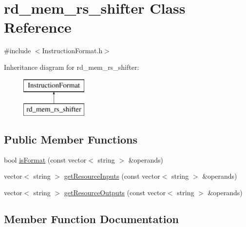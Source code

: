 \hypertarget{classrd__mem__rs__shifter}{}\section{rd\+\_\+mem\+\_\+rs\+\_\+shifter Class Reference}
\label{classrd__mem__rs__shifter}


{\ttfamily \#include $<$Instruction\+Format.\+h$>$}

Inheritance diagram for rd\+\_\+mem\+\_\+rs\+\_\+shifter\+:\begin{figure}[H]
\begin{center}
\leavevmode
\includegraphics[height=2.000000cm]{classrd__mem__rs__shifter}
\end{center}
\end{figure}
\subsection*{Public Member Functions}
\begin{DoxyCompactItemize}
\item 
bool \hyperlink{classrd__mem__rs__shifter_a483c16d44defe4965af7850ba9529cd7}{is\+Format} (const vector$<$ string $>$ \&operands)
\item 
vector$<$ string $>$ \hyperlink{classrd__mem__rs__shifter_a834887022a5d0ac6ddf56df2c2966975}{get\+Resource\+Inputs} (const vector$<$ string $>$ \&operands)
\item 
vector$<$ string $>$ \hyperlink{classrd__mem__rs__shifter_aa0e2be11d366b4dda2b50f14194ddfbf}{get\+Resource\+Outputs} (const vector$<$ string $>$ \&operands)
\end{DoxyCompactItemize}


\subsection{Member Function Documentation}
\mbox{\label{classrd__mem__rs__shifter_a834887022a5d0ac6ddf56df2c2966975}} 
